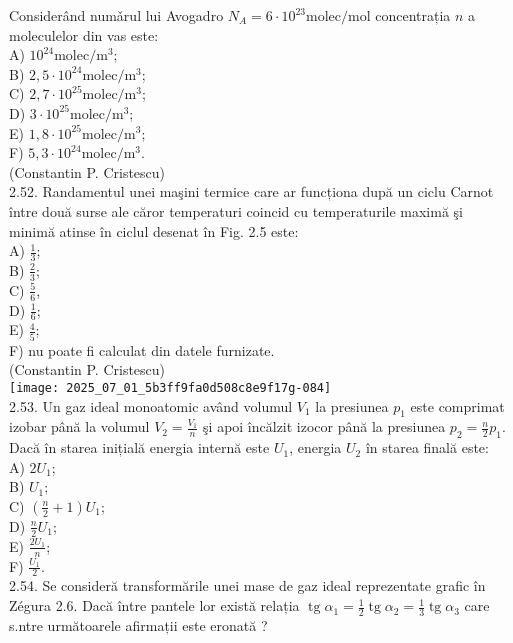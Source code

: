 Considerând numǎrul lui Avogadro $N_{A}=6 \cdot 10^{23} \mathrm{molec} / \mathrm{mol}$ concentrația $n$ a moleculelor din vas este:\\
A) $10^{24} \mathrm{molec} / \mathrm{m}^{3}$;\\
B) $2,5 \cdot 10^{24} \mathrm{molec} / \mathrm{m}^{3}$;\\
C) $2,7 \cdot 10^{25} \mathrm{molec} / \mathrm{m}^{3}$;\\
D) $3 \cdot 10^{25} \mathrm{molec} / \mathrm{m}^{3}$;\\
E) $1,8 \cdot 10^{25} \mathrm{molec} / \mathrm{m}^{3}$;\\
F) $5,3 \cdot 10^{24} \mathrm{molec} / \mathrm{m}^{3}$.\\
(Constantin P. Cristescu)\\
2.52. Randamentul unei maşini termice care ar funcționa după un ciclu Carnot între două surse ale căror temperaturi coincid cu temperaturile maximă şi minimă atinse în ciclul desenat în Fig. 2.5 este:\\
A) $\frac{1}{3}$;\\
B) $\frac{2}{3}$;\\
C) $\frac{5}{6}$,\\
D) $\frac{1}{6}$;\\
E) $\frac{4}{5}$;\\
F) nu poate fi calculat din datele furnizate.\\
(Constantin P. Cristescu)\\
\texttt{[image: 2025\_07\_01\_5b3ff9fa0d508c8e9f17g-084]}\\
2.53. Un gaz ideal monoatomic având volumul $V_{1}$ la presiunea $p_{1}$ este comprimat izobar până la volumul $V_{2}=\frac{V_{1}}{n}$ şi apoi încălzit izocor până la presiunea $p_{2}=\frac{n}{2} p_{1}$. Dacă în starea inițială energia internă este $U_{1}$, energia $U_{2}$ în starea finală este:\\
A) $2 U_{1}$;\\
B) $U_{1}$;\\
C) $\left(\frac{n}{2}+1\right) U_{1}$;\\
D) $\frac{n}{2} U_{1}$;\\
E) $\frac{2 U_{1}}{n}$;\\
F) $\frac{U_{1}}{2}$.\\
2.54. Se consideră transformările unei mase de gaz ideal reprezentate grafic în Zégura 2.6. Dacă între pantele lor există relația $\operatorname{tg} \alpha_{1}=\frac{1}{2} \operatorname{tg} \alpha_{2}=\frac{1}{3} \operatorname{tg} \alpha_{3}$ care s.ntre următoarele afirmații este eronată ?\\
